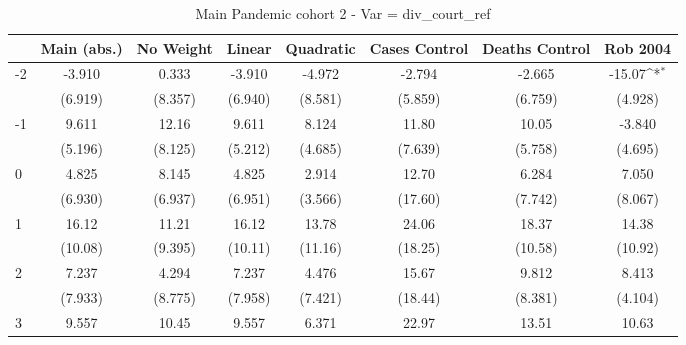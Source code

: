 \documentclass{article}
\begin{document}
{
\def\sym#1{\ifmmode^{#1}\else\(^{#1}\)\fi}
\begin{longtable}{l*{7}{c}}
\caption{Main Pandemic cohort 2 - Var = div\_court\_ref}\\
\hline\hline\endfirsthead\hline\endhead\hline\endfoot\endlastfoot
                &\multicolumn{1}{c}{Main (abs.)}&\multicolumn{1}{c}{No Weight}&\multicolumn{1}{c}{Linear}&\multicolumn{1}{c}{Quadratic}&\multicolumn{1}{c}{Cases Control}&\multicolumn{1}{c}{Deaths Control}&\multicolumn{1}{c}{Rob 2004}\\
\hline
-2              &   -3.910         &    0.333         &   -3.910         &   -4.972         &   -2.794         &   -2.665         &   -15.07\sym{*}  \\
                &  (6.919)         &  (8.357)         &  (6.940)         &  (8.581)         &  (5.859)         &  (6.759)         &  (4.928)         \\
-1              &    9.611         &    12.16         &    9.611         &    8.124         &    11.80         &    10.05         &   -3.840         \\
                &  (5.196)         &  (8.125)         &  (5.212)         &  (4.685)         &  (7.639)         &  (5.758)         &  (4.695)         \\
0               &    4.825         &    8.145         &    4.825         &    2.914         &    12.70         &    6.284         &    7.050         \\
                &  (6.930)         &  (6.937)         &  (6.951)         &  (3.566)         &  (17.60)         &  (7.742)         &  (8.067)         \\
1               &    16.12         &    11.21         &    16.12         &    13.78         &    24.06         &    18.37         &    14.38         \\
                &  (10.08)         &  (9.395)         &  (10.11)         &  (11.16)         &  (18.25)         &  (10.58)         &  (10.92)         \\
2               &    7.237         &    4.294         &    7.237         &    4.476         &    15.67         &    9.812         &    8.413         \\
                &  (7.933)         &  (8.775)         &  (7.958)         &  (7.421)         &  (18.44)         &  (8.381)         &  (4.104)         \\
3               &    9.557         &    10.45         &    9.557         &    6.371         &    22.97         &    13.51         &    10.63         \\

\end{longtable}}
\end{document}
